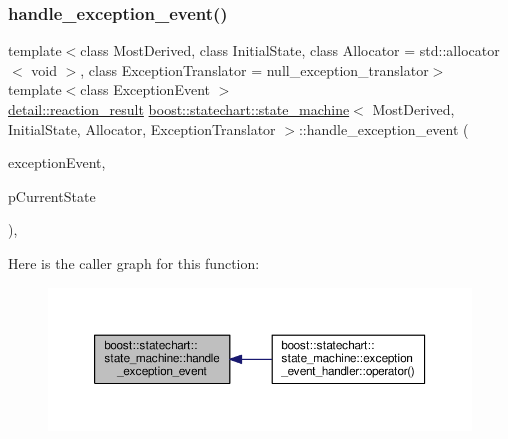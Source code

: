 \subsubsection{\texorpdfstring{handle\+\_\+exception\+\_\+event()}{handle\_exception\_event()}}
{\footnotesize\ttfamily template$<$class Most\+Derived, class Initial\+State, class Allocator = std\+::allocator$<$ void $>$, class Exception\+Translator = null\+\_\+exception\+\_\+translator$>$ \\
template$<$class Exception\+Event $>$ \\
\mbox{\hyperlink{namespaceboost_1_1statechart_1_1detail_ab091bbb4c29327fb46ee479ea1b7255b}{detail\+::reaction\+\_\+result}} \mbox{\hyperlink{classboost_1_1statechart_1_1state__machine}{boost\+::statechart\+::state\+\_\+machine}}$<$ Most\+Derived, Initial\+State, Allocator, Exception\+Translator $>$\+::handle\+\_\+exception\+\_\+event (\begin{DoxyParamCaption}\item[{const Exception\+Event \&}]{exception\+Event,  }\item[{\mbox{\hyperlink{classboost_1_1statechart_1_1state__machine_a69cc258c29fcabec25c5dc8bedb7d530}{state\+\_\+base\+\_\+type}} $\ast$}]{p\+Current\+State }\end{DoxyParamCaption})\hspace{0.3cm}{\ttfamily [inline]}, {\ttfamily [private]}}

Here is the caller graph for this function\+:
\nopagebreak
\begin{figure}[H]
\begin{center}
\leavevmode
\includegraphics[width=350pt]{classboost_1_1statechart_1_1state__machine_a870e55352a7a01e7224ae0f06f89b0e9_icgraph}
\end{center}
\end{figure}
\mbox{\label{classboost_1_1statechart_1_1state__machine_a858feecd60fbbb1484cc8e01c1e1b5b0}} 
